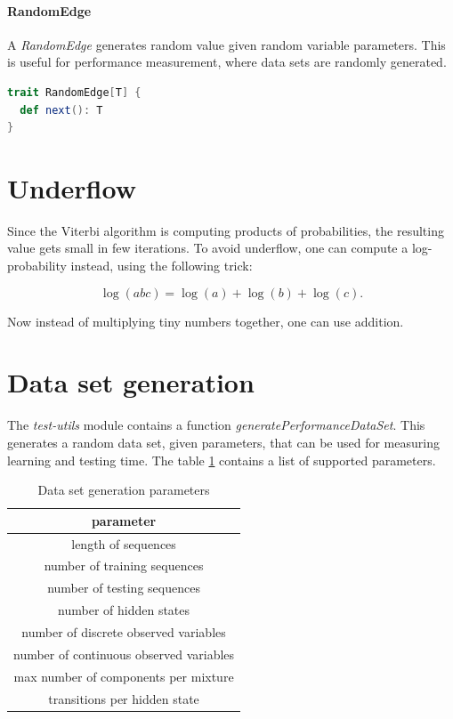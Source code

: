 \documentclass[thesis=B,english]{FITthesis}[2012/06/26]
\begin{document}
\paragraph{RandomEdge}

A \textit{RandomEdge} generates random value given random variable parameters. This is useful for performance measurement, where data sets are randomly generated.

\begin{lstlisting}[language=Scala]
trait RandomEdge[T] {
  def next(): T
}
\end{lstlisting}

\section{Underflow}

Since the Viterbi algorithm is computing products of probabilities, the resulting value gets small in few iterations. To avoid underflow, one can compute a log-probability instead, using the following trick:

\begin{equation*}
\log(abc) = \log(a)+\log(b)+\log(c).
\end{equation*}

Now instead of multiplying tiny numbers together, one can use addition.

\section{Data set generation}

The \textit{test-utils} module contains a function \textit{generatePerformanceDataSet}. This generates a random data set, given parameters, that can be used for measuring learning and testing time. The table \ref{tab:generation-parameters} contains a list of supported parameters.

\begin{table}
\centering
\begin{tabular}{|c|}
	\hline
	parameter \\
	\hline
	length of sequences \\
	number of training sequences \\
	number of testing sequences \\
	number of hidden states \\
	number of discrete observed variables \\
	number of continuous observed variables \\
	max number of components per mixture \\
	transitions per hidden state \\
	\hline
\end{tabular}
\caption{Data set generation parameters}
\label{tab:generation-parameters}
\end{table}
\end{document}
